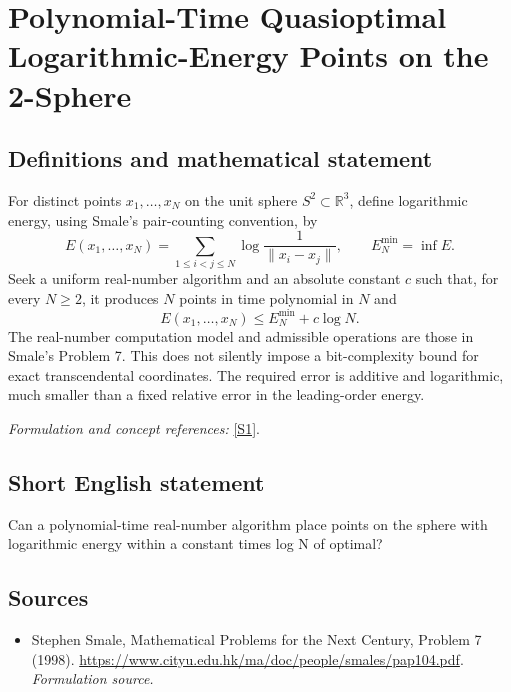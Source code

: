 \documentclass[11pt]{article}
\begin{document}
\section*{\texorpdfstring{Polynomial-Time Quasioptimal Logarithmic-Energy Points on the 2-Sphere}{Polynomial-Time Quasioptimal Logarithmic-Energy Points on the 2-Sphere}}\label{474}
\subsection{Definitions and mathematical statement}
For distinct points $x_1,\ldots,x_N$ on the unit sphere $S^2\subset{\mathbb{R}}^3$, define logarithmic energy, using Smale's pair-counting convention, by
\[
 E(x_1,\ldots,x_N)=\sum_{1\le i<j\le N}
 \log\frac1{\|x_i-x_j\|},\qquad E_N^{\min}=\inf E.
\]
Seek a uniform real-number algorithm and an absolute constant $c$ such that, for every $N\ge2$, it produces $N$ points in time polynomial in $N$ and
\[
 E(x_1,\ldots,x_N)\le E_N^{\min}+c\log N.
\]
The real-number computation model and admissible operations are those in Smale's Problem 7. This does not silently impose a bit-complexity bound for exact transcendental coordinates. The required error is additive and logarithmic, much smaller than a fixed relative error in the leading-order energy.
\par\smallskip\textit{Formulation and concept references:} \href{https://www.cityu.edu.hk/ma/doc/people/smales/pap104.pdf}{[S1]}.

\subsection{Short English statement}
Can a polynomial-time real-number algorithm place points on the sphere with logarithmic energy within a constant times log N of optimal?
\subsection{Sources}
\begin{itemize}
\item[S1]Stephen Smale, Mathematical Problems for the Next Century, Problem 7 (1998).
\url{https://www.cityu.edu.hk/ma/doc/people/smales/pap104.pdf}.
\textit{Formulation source.}
\end{itemize}
\end{document}
